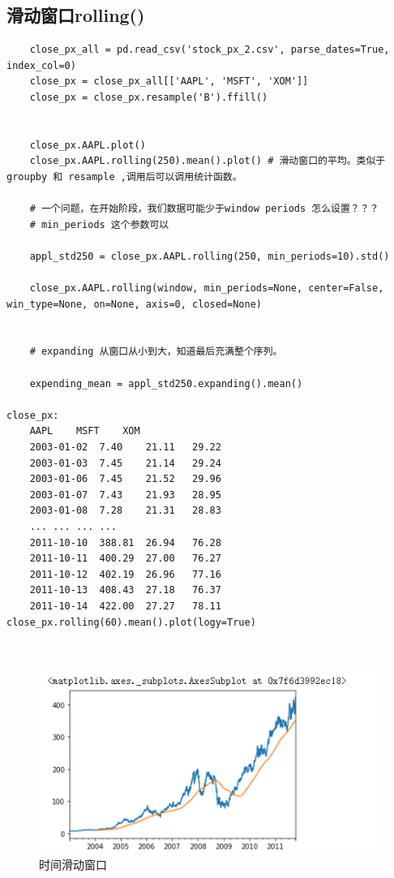 \documentclass{article}
\begin{document}
\subsection{滑动窗口rolling()}
\begin{lstlisting}
	close_px_all = pd.read_csv('stock_px_2.csv', parse_dates=True, index_col=0)
	close_px = close_px_all[['AAPL', 'MSFT', 'XOM']]
	close_px = close_px.resample('B').ffill()
	
	
	close_px.AAPL.plot()
	close_px.AAPL.rolling(250).mean().plot() # 滑动窗口的平均。类似于groupby 和 resample ,调用后可以调用统计函数。
	
	# 一个问题，在开始阶段，我们数据可能少于window periods 怎么设置？？？
	# min_periods 这个参数可以
	
	appl_std250 = close_px.AAPL.rolling(250, min_periods=10).std()
	
	close_px.AAPL.rolling(window, min_periods=None, center=False, win_type=None, on=None, axis=0, closed=None)
	
	
	# expanding 从窗口从小到大，知道最后充满整个序列。
	
	expending_mean = appl_std250.expanding().mean()
	
close_px:
	AAPL	MSFT	XOM
	2003-01-02	7.40	21.11	29.22
	2003-01-03	7.45	21.14	29.24
	2003-01-06	7.45	21.52	29.96
	2003-01-07	7.43	21.93	28.95
	2003-01-08	7.28	21.31	28.83
	...	...	...	...
	2011-10-10	388.81	26.94	76.28
	2011-10-11	400.29	27.00	76.27
	2011-10-12	402.19	26.96	77.16
	2011-10-13	408.43	27.18	76.37
	2011-10-14	422.00	27.27	78.11
close_px.rolling(60).mean().plot(logy=True)
	
	
\end{lstlisting}

\begin{figure}[tbhp]
	\centering
	\includegraphics[width=\linewidth]{fig/t4}
	\caption{时间滑动窗口}
	\label{fig-timeswap}
\end{figure}
\end{document}
